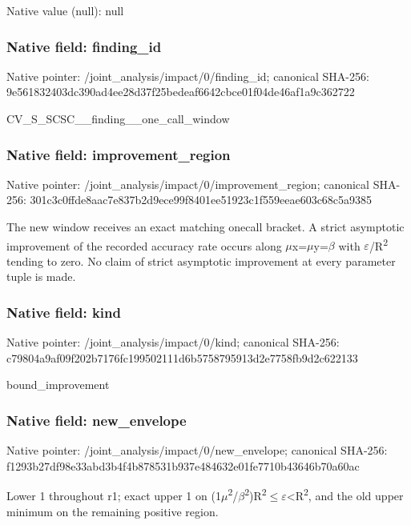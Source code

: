 \documentclass[10pt,a4paper]{article}
\begin{document}
Native value (null): null



\subsubsection{Native field: finding\_id}


Native pointer: /joint\_analysis/impact/0/finding\_id; canonical SHA-256: 9e561832403dc390ad4ee28d\allowbreak{}37f25bedeaf6642cbce01f04\allowbreak{}de46af1a9c362722


CV\_S\_SCSC\_\_finding\_\_one\_call\_window


\subsubsection{Native field: improvement\_region}


Native pointer: /joint\_analysis/impact/0\allowbreak{}/improvement\_region; canonical SHA-256: 301c3c0ffde8aac7e837b2d9\allowbreak{}ece99f8401ee51923c1f559e\allowbreak{}eae603c68c5a9385


The new window receives an exact matching onecall bracket. A strict asymptotic improvement of the recorded accuracy rate occurs along \ensuremath{\mu}x=\ensuremath{\mu}y=\ensuremath{\beta} with \ensuremath{\varepsilon}/R\textsuperscript{2} tending to zero. No claim of strict asymptotic improvement at every parameter tuple is made.


\subsubsection{Native field: kind}


Native pointer: /joint\_analysis/impact/0/kind; canonical SHA-256: c79804a9af09f202b7176fc1\allowbreak{}99502111d6b5758795913d2e\allowbreak{}7758fb9d2c622133


bound\_improvement


\subsubsection{Native field: new\_envelope}


Native pointer: /joint\_analysis/impact/0/new\_envelope; canonical SHA-256: f1293b27df98e33abd3b4f4b\allowbreak{}878531b937e484632e01fe77\allowbreak{}10b43646b70a60ac


Lower 1 throughout r1; exact upper 1 on (1\ensuremath{\mu}\textsuperscript{2}/\ensuremath{\beta}\textsuperscript{2})R\textsuperscript{2}\ensuremath{\le}\ensuremath{\varepsilon}<R\textsuperscript{2}, and the old upper minimum on the remaining positive region.
\end{document}
